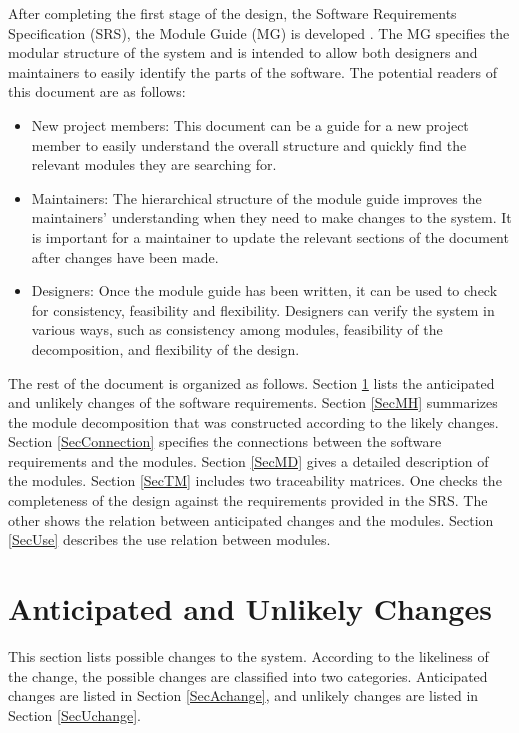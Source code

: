 \documentclass[12pt, titlepage]{article}
\begin{document}
After completing the first stage of the design, the Software Requirements
Specification (SRS), the Module Guide (MG) is developed
\cite{parnas_modular_1985}. The MG
specifies the modular structure of the system and is intended to allow both
designers and maintainers to easily identify the parts of the software.  The
potential readers of this document are as follows:

\begin{itemize}
\item New project members: This document can be a guide for a new project member
  to easily understand the overall structure and quickly find the
  relevant modules they are searching for.
\item Maintainers: The hierarchical structure of the module guide improves the
  maintainers' understanding when they need to make changes to the system. It is
  important for a maintainer to update the relevant sections of the document
  after changes have been made.
\item Designers: Once the module guide has been written, it can be used to
  check for consistency, feasibility and flexibility. Designers can verify the
  system in various ways, such as consistency among modules, feasibility of the
  decomposition, and flexibility of the design.
\end{itemize}

The rest of the document is organized as follows. Section
\ref{SecChange} lists the anticipated and unlikely changes of the software
requirements. Section \ref{SecMH} summarizes the module decomposition that
was constructed according to the likely changes. Section \ref{SecConnection}
specifies the connections between the software requirements and the
modules. Section \ref{SecMD} gives a detailed description of the
modules. Section \ref{SecTM} includes two traceability matrices. One checks
the completeness of the design against the requirements provided in the SRS. The
other shows the relation between anticipated changes and the modules. Section
\ref{SecUse} describes the use relation between modules.

\section{Anticipated and Unlikely Changes} \label{SecChange}

This section lists possible changes to the system. According to the likeliness
of the change, the possible changes are classified into two
categories. Anticipated changes are listed in Section \ref{SecAchange}, and
unlikely changes are listed in Section \ref{SecUchange}.
\end{document}
